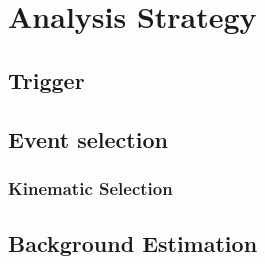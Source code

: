 \section{Analysis Strategy}
\subsection{Trigger}
\subsection{Event selection}
\subsubsection{Kinematic Selection}
\subsection{Background Estimation}

